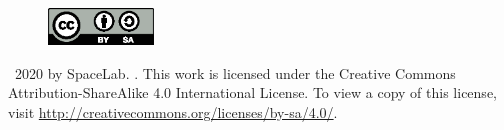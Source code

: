 \vfill

\begin{figure}[!h]
	\begin{center}
		\includegraphics[width=0.25\textwidth]{figures/by-sa.eps}
	\end{center}
\end{figure}

\textcopyright\  2020 by SpaceLab. \thetitle. This work is licensed under the Creative Commons Attribution-ShareAlike 4.0 International License. To view a copy of this license, visit \href{http://creativecommons.org/licenses/by-sa/4.0/}{http://creativecommons.org/licenses/by-sa/4.0/}.
